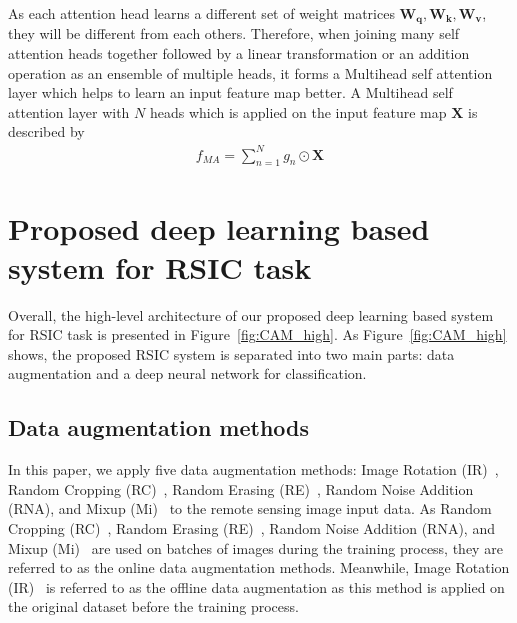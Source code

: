 \documentclass[sigconf]{acmart}
\begin{document}
As each attention head learns a different set of weight matrices $\mathbf{W_{q}, W_{k}, W_{v}}$, they will be different from each others. 
Therefore, when joining many self attention heads together followed by a linear transformation or an addition operation as an ensemble of multiple heads, it forms a Multihead self attention layer which helps to learn an input feature map better.
A Multihead self attention layer with $N$ heads which is applied on the input feature map $\mathbf{X}$ is described by
\begin{align}
    \label{eq:mha_head}
     f_{MA}=  \sum_{n=1}^{N} g_{n}   \odot \mathbf{X}
\end{align}

\section{Proposed deep learning based system for RSIC task}
\label{framework}

Overall, the high-level architecture of our proposed deep learning based system for RSIC task is presented in Figure~\ref{fig:CAM_high}. 
As Figure~\ref{fig:CAM_high} shows, the proposed RSIC system is separated into two main parts: data augmentation and a deep neural network for classification.

\subsection{Data augmentation methods}
\label{augmentation}

In this paper, we apply five data augmentation methods: Image Rotation (IR)~\cite{rotation_aug}, Random Cropping (RC)~\cite{rotation_aug}, Random Erasing (RE)~\cite{spec_crop}, Random Noise Addition (RNA), and Mixup (Mi)~\cite{mixup1, mixup2} to the remote sensing image input data.
As Random Cropping (RC)~\cite{rotation_aug}, Random Erasing (RE)~\cite{spec_crop}, Random Noise Addition (RNA), and Mixup (Mi)~\cite{mixup1, mixup2} are used on batches of images during the training process, they are referred to as the online data augmentation methods. 
Meanwhile, Image Rotation (IR)~\cite{rotation_aug} is referred to as the offline data augmentation as this method is applied on the original dataset before the training process.
\end{document}
